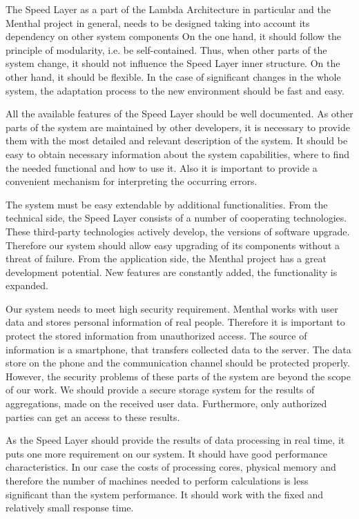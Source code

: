 The Speed Layer as a part of the Lambda Architecture in particular and the Menthal project in general, needs to be designed taking into account its dependency on other system components
On the one hand, it should follow the principle of modularity, i.e. be self-contained.
Thus, when other parts of the system change, it should not influence the Speed Layer inner structure.
On the other hand, it should be flexible.
In the case of significant changes in the whole system, the adaptation process to the new environment should be fast and easy.

All the available features of the Speed Layer should be well documented.
As other parts of the system are maintained by other developers, it is necessary to provide them with the most detailed and relevant description of the system.
It should be easy to obtain necessary information about the system capabilities, where to find the needed functional and how to use it.
Also it is important to provide a convenient mechanism for interpreting the occurring errors. 	    

The system must be easy extendable by additional functionalities.
From the technical side, the Speed Layer consists of a number of cooperating technologies.
These third-party technologies actively develop, the versions of software upgrade.
Therefore our system should allow easy upgrading of its components without a threat of failure.
From the application side, the Menthal project has a great development potential.
New features are constantly added, the functionality is expanded.

Our system needs to meet high security requirement.
Menthal works with user data and stores personal information of real people.
Therefore it is important to protect the stored information from unauthorized access.
The source of information is a smartphone, that transfers collected data to the server.
The data store on the phone and the communication channel should be protected properly.
However, the security problems of these parts of the system are beyond the scope of our work.
We should provide a secure storage system for the results of aggregations, made on the received user data.
Furthermore, only authorized parties can get an access to these results.

As the Speed Layer should provide the results of data processing in real time, it puts one more requirement on our system.
It should have good performance characteristics.
In our case the costs of processing cores, physical memory and therefore the number of machines needed to perform calculations is less significant than the system performance.
It should work with the fixed and relatively small response time. 

